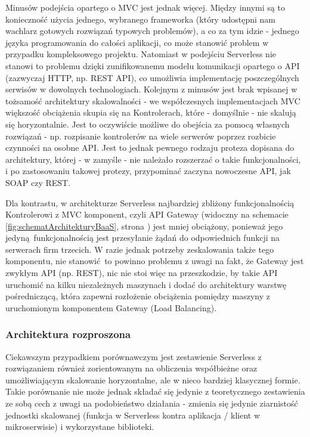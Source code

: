 \documentclass[oneside]{mgr}
\begin{document}
Minusów podejścia opartego o MVC jest jednak więcej. Między innymi są to konieczność użycia jednego, wybranego frameworka (który udostępni nam wachlarz gotowych rozwiązań typowych problemów), a co za tym idzie - jednego języka programowania do całości aplikacji, co może stanowić problem w przypadku kompleksowego projektu. Natomiast w podejściu Serverless nie stanowi to problemu dzięki zunifikowanemu modelu komunikacji opartego o API (zazwyczaj HTTP, np. REST API), co umożliwia implementację poszczególnych serwisów w dowolnych technologiach. Kolejnym z minusów jest brak wpisanej w tożsamość architektury skalowalności - we współczesnych implementacjach MVC większość obciążenia skupia się na Kontrolerach, które - domyślnie - nie skalują się horyzontalnie. Jest to oczywiście możliwe do obejścia za pomocą własnych rozwiązań - np. rozpisanie kontrolerów na wiele serwerów poprzez rozbicie czynności na osobne API. Jest to jednak pewnego rodzaju proteza dopisana do architektury, której - w zamyśle - nie należało rozszerzać o takie funkcjonalności, i po zastosowaniu takowej protezy, przypominać zaczyna nowoczesne API, jak SOAP czy REST.

Dla kontrastu, w architekturze Serverless najbardziej zbliżony funkcjonalnością Kontrolerowi z MVC komponent, czyli API Gateway (widoczny na schemacie \ref{fig:schematArchitekturyBaaS}, strona \pageref{fig:schematArchitekturyBaaS}) jest mniej obciążony, ponieważ jego jedyną funkcjonalnością jest przesyłanie żądań do odpowiednich funkcji na serwerach firm trzecich. W razie jednak potrzeby zeskalowania także tego komponentu, nie stanowić to powinno problemu z uwagi na fakt, że Gateway jest zwykłym API (np. REST), nic nie stoi więc na przeszkodzie, by takie API uruchomić na kilku niezależnych maszynach i dodać do architektury warstwę pośredniczącą, która zapewni rozłożenie obciążenia pomiędzy maszyny z uruchomionym komponentem Gateway (Load Balancing).

\subsubsection{Architektura rozproszona}
Ciekawszym przypadkiem porównawczym jest zestawienie Serverless z rozwiązaniem również zorientowanym na obliczenia współbieżne oraz umożliwiającym skalowanie horyzontalne, ale w nieco bardziej klasycznej formie. Takie porównanie nie może jednak składać się jedynie z teoretycznego zestawienia ze sobą cech z uwagi na podobieństwo działania - zmienia się jedynie ziarnistość jednostki skalowanej (funkcja w Serverless kontra aplikacja / klient w mikroserwisie) i wykorzystane biblioteki.
\end{document}
